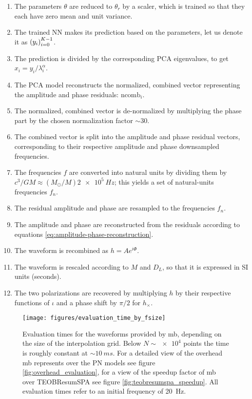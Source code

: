 \documentclass[main.tex]{subfiles}
\begin{document}
\begin{enumerate}
    \item The parameters \(\theta \) are reduced to \(\theta _r\) by a scaler, which is trained so that they each have zero mean and unit variance. 
    \item The trained \ac{NN} makes its prediction based on the parameters, let us denote it as \(\qty(y_i)_{i=0}^{K-1}\).
    \item The prediction is divided by the corresponding \ac{PCA} eigenvalues, to get \(x_i = y_i / \lambda _i^{\alpha }\).
    \item The \ac{PCA} model reconstructs the normalized, combined vector representing the amplitude and phase residuals: \(\text{ncomb}_i\). 
    \item The normalized, combined vector is de-normalized by multiplying the phase part by the chosen normalization factor \(\sim 30\).
    \item The combined vector is split into the amplitude and phase residual vectors, corresponding to their respective amplitude and phase downsampled frequencies.
    \item The frequencies \(f\) are converted into natural units by dividing them by \(c^3 / GM \approx (M_{\odot} / M) \SI{2e5}{Hz}\); this yields a set of natural-units frequencies \(f_n\). 
    \item The residual amplitude and phase are resampled to the frequencies \(f_n\).
    \item The amplitude and phase are reconstructed from the residuals according to equations \eqref{eq:amplitude-phase-reconstruction}.
    \item The waveform is recombined as \(h = A e^{i \Phi }\).
    \item The waveform is rescaled according to \(M\) and \(D_L\), so that it is expressed in SI units (seconds).
    \item The two polarizations are recovered by multiplying \(h\) by their respective functions of \(\iota \) and a phase shift by \(\pi /2\) for \(h_ \times \). 
\end{enumerate}

\begin{figure}[ht]
\centering
\texttt{[image: figures/evaluation\_time\_by\_fsize]}
\caption{Evaluation times for the waveforms provided by \ac{mb}, depending on the size of the interpolation grid. Below \(N \sim \num{e4}\) points the time is roughly constant at \(\sim \SI{10}{ms}\). For a detailed view of the overhead \ac{mb} represents over the \ac{PN} models see figure \ref{fig:overhead_evaluation}, for a view of the speedup factor of \ac{mb} over TEOBResumSPA see figure \ref{fig:teobresumspa_speedup}. All evaluation times refer to an initial frequency of \SI{20}{Hz}.}
\label{fig:evaluation_time_by_fsize}
\end{figure}
\end{document}
